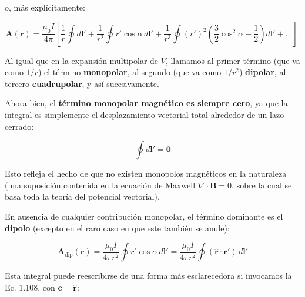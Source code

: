 \documentclass[12pt,a4paper]{report}
\newcommand{\esp}{\vspace{0.5cm}}
\begin{document}
	\esp
	
	\noindent o, más explícitamente:
	
	\esp
	
	\begin{equation}
		\mathbf{A}(\mathbf{r}) = \frac{\mu_0 I}{4\pi} \left[ \frac{1}{r} \oint d\mathbf{l}' + \frac{1}{r^2} \oint r' \cos \alpha \, d\mathbf{l}' + \frac{1}{r^3} \oint (r')^2 \left( \frac{3}{2} \cos^2 \alpha - \frac{1}{2} \right) d\mathbf{l}' + \dots \right].
	\end{equation}
	
	\esp
	
	Al igual que en la expansión multipolar de $V$, llamamos al primer término (que va como $1/r$) el término \textbf{monopolar}, al segundo (que va como $1/r^2$) \textbf{dipolar}, al tercero \textbf{cuadrupolar}, y así sucesivamente.
	
	\esp
	
	Ahora bien, el \textbf{término monopolar magnético es siempre cero}, ya que la integral es simplemente el desplazamiento vectorial total alrededor de un lazo cerrado:
	
	\esp
	
	\begin{equation}
		\oint d\mathbf{l}' = \mathbf{0}
	\end{equation}
	
	\esp
	
	Esto refleja el hecho de que no existen monopolos magnéticos en la naturaleza (una suposición contenida en la ecuación de Maxwell $\nabla \cdot \mathbf{B} = 0$, sobre la cual se basa toda la teoría del potencial vectorial).
	
	\esp
	
	En ausencia de cualquier contribución monopolar, el término dominante es el \textbf{dipolo} (excepto en el raro caso en que este también se anule):
	
	\esp
	
	\begin{equation}
		\mathbf{A}_{\text{dip}}(\mathbf{r}) = \frac{\mu_0 I}{4\pi r^2} \oint r' \cos \alpha \, d\mathbf{l}' = \frac{\mu_0 I}{4\pi r^2} \oint (\mathbf{\hat{r}} \cdot \mathbf{r}') \, d\mathbf{l}'
	\end{equation}
	
	\esp
	
	Esta integral puede reescribirse de una forma más esclarecedora si invocamos la Ec. 1.108, con $\mathbf{c} = \mathbf{\hat{r}}$:
	
	\esp
	
\end{document}
